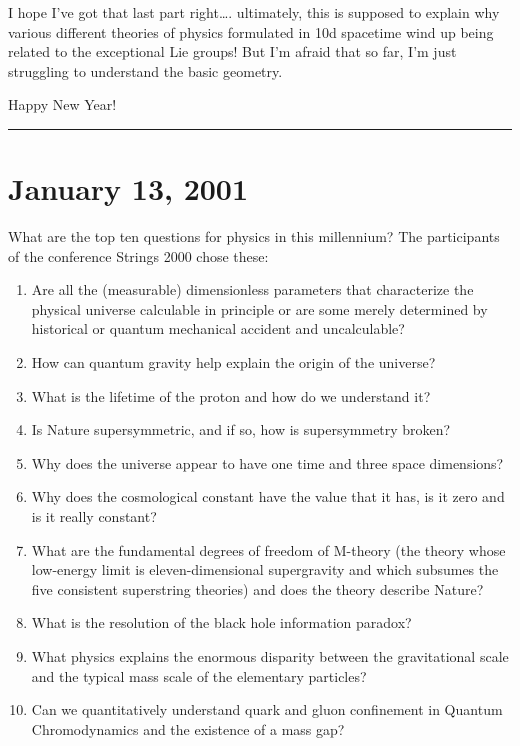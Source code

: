 \documentclass{article}
\def\tightlist{}
\begin{document}
I hope I've got that last part right\ldots. ultimately, this is supposed
to explain why various different theories of physics formulated in 10d
spacetime wind up being related to the exceptional Lie groups! But I'm
afraid that so far, I'm just struggling to understand the basic
geometry.

Happy New Year!

\begin{center}\rule{0.5\linewidth}{0.5pt}\end{center}



\hypertarget{week164}{%
\section{January 13, 2001}\label{week164}}

What are the top ten questions for physics in this millennium? The
participants of the conference Strings 2000 chose these:

\begin{enumerate}
\def\labelenumi{\arabic{enumi}.}
\tightlist
\item
  Are all the (measurable) dimensionless parameters that characterize
  the physical universe calculable in principle or are some merely
  determined by historical or quantum mechanical accident and
  uncalculable?
\item
  How can quantum gravity help explain the origin of the universe?
\item
  What is the lifetime of the proton and how do we understand it?
\item
  Is Nature supersymmetric, and if so, how is supersymmetry broken?
\item
  Why does the universe appear to have one time and three space
  dimensions?
\item
  Why does the cosmological constant have the value that it has, is it
  zero and is it really constant?
\item
  What are the fundamental degrees of freedom of M-theory (the theory
  whose low-energy limit is eleven-dimensional supergravity and which
  subsumes the five consistent superstring theories) and does the theory
  describe Nature?
\item
  What is the resolution of the black hole information paradox?
\item
  What physics explains the enormous disparity between the gravitational
  scale and the typical mass scale of the elementary particles?
\item
  Can we quantitatively understand quark and gluon confinement in
  Quantum Chromodynamics and the existence of a mass gap?
\end{enumerate}
\end{document}
